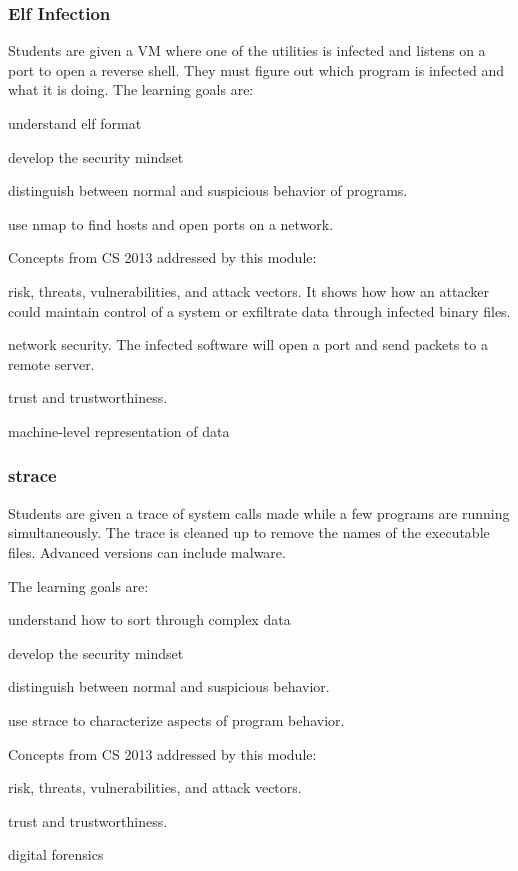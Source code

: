 \subsubsection{Elf Infection}
Students are given a VM where one of the utilities is infected and listens on a port to open
a reverse shell.  They must figure out which program is infected and what it is doing.
The learning goals are:
\begin{packenum}
\item understand elf format
\item develop the security mindset
\item distinguish between normal and suspicious behavior of programs.
\item use nmap to find hosts and open ports on a network.
\end{packenum}
Concepts from CS 2013 addressed by this module:
\begin{packenum}
\item  risk, threats, vulnerabilities, and attack vectors.  It shows how how an attacker
  could maintain control of a system or exfiltrate data through infected binary files.
\item network security.  The infected software will open a port and send packets to a remote server.
\item trust and trustworthiness.
\item machine-level representation of data
\end{packenum}

\subsubsection{strace}
Students are given a trace of system calls made while a few programs are running simultaneously.
The trace is cleaned up to remove the names of the executable files.
Advanced versions can include malware.

The learning goals are:
\begin{packenum}
\item understand how to sort through complex data
\item develop the security mindset
\item distinguish between normal and suspicious behavior.
\item use strace to characterize aspects of program behavior.
\end{packenum}
Concepts from CS 2013 addressed by this module:
\begin{packenum}
\item  risk, threats, vulnerabilities, and attack vectors.  
\item trust and trustworthiness.
\item digital forensics
\end{packenum}

